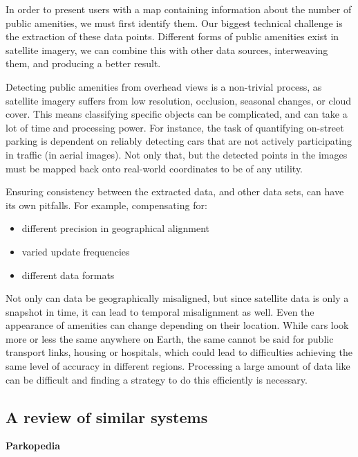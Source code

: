 \noindent{}In order to present users with a map containing information about the
number of public amenities, we must first identify them. Our biggest technical
challenge is the extraction of these data points. Different forms of public
amenities exist in satellite imagery, we can combine this with other data
sources, interweaving them, and producing a better result.

\noindent{}Detecting public amenities from overhead views is a non-trivial process,
as satellite imagery suffers from low resolution, occlusion, seasonal changes, or
cloud cover. This means classifying specific objects can be complicated, and can
take a lot of time and processing power. For instance, the task of quantifying
on-street parking is dependent on reliably detecting cars that are not actively
participating in traffic (in aerial images). Not only that, but the detected
points in the images must be mapped back onto real-world coordinates to be of
any utility.

\noindent{}Ensuring consistency between the extracted data, and other data sets,
can have its own pitfalls. For example, compensating for:

\vspace{-3mm}
\begin{itemize}
  \item{different precision in geographical alignment}
  \item{varied update frequencies}
  \item{different data formats}
\end{itemize}
\vspace{-3mm}

\noindent{}Not only can data be geographically misaligned, but since satellite
data is only a snapshot in time, it can lead to temporal misalignment as well.
Even the appearance of amenities can change depending on their location. While
cars look more or less the same anywhere on Earth, the same cannot be said for
public transport links, housing or hospitals, which could lead to difficulties
achieving the same level of accuracy in different regions. Processing a large
amount of data like can be difficult and finding a strategy to do this
efficiently is necessary.

\subsection{A review of similar systems}

\noindent{}\textbf{Parkopedia}

